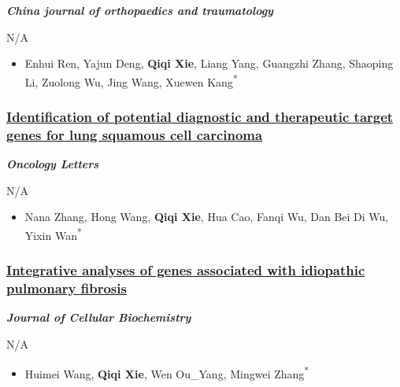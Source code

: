 \documentclass[
]{article}
\providecommand{\tightlist}{%
  \setlength{\itemsep}{0pt}\setlength{\parskip}{0pt}}
\begin{document}
\textbf{\emph{China journal of orthopaedics and traumatology}}

N/A

\begin{itemize}
\tightlist
\item
  Enhui Ren, Yajun Deng, \textbf{Qiqi Xie}, Liang Yang, Guangzhi Zhang,
  Shaoping Li, Zuolong Wu, Jing Wang, Xuewen Kang\textsuperscript{*}
\end{itemize}

\hypertarget{identification-of-potential-diagnostic-and-therapeutic-target-genes-for-lung-squamous-cell-carcinoma}{%
\subsubsection{\texorpdfstring{\href{https://doi.org/10.3892/ol.2019.10300}{Identification
of potential diagnostic and therapeutic target genes for lung squamous
cell
carcinoma}}{Identification of potential diagnostic and therapeutic target genes for lung squamous cell carcinoma}}\label{identification-of-potential-diagnostic-and-therapeutic-target-genes-for-lung-squamous-cell-carcinoma}}

\textbf{\emph{Oncology Letters}}

N/A

\begin{itemize}
\tightlist
\item
  Nana Zhang, Hong Wang, \textbf{Qiqi Xie}, Hua Cao, Fanqi Wu, Dan Bei
  Di Wu, Yixin Wan\textsuperscript{*}
\end{itemize}

\hypertarget{integrative-analyses-of-genes-associated-with-idiopathic-pulmonary-fibrosis}{%
\subsubsection{\texorpdfstring{\href{https://doi.org/10.1002/jcb.28153}{Integrative
analyses of genes associated with idiopathic pulmonary
fibrosis}}{Integrative analyses of genes associated with idiopathic pulmonary fibrosis}}\label{integrative-analyses-of-genes-associated-with-idiopathic-pulmonary-fibrosis}}

\textbf{\emph{Journal of Cellular Biochemistry}}

N/A

\begin{itemize}
\tightlist
\item
  Huimei Wang, \textbf{Qiqi Xie}, Wen Ou\_Yang, Mingwei
  Zhang\textsuperscript{*}
\end{itemize}
\end{document}
